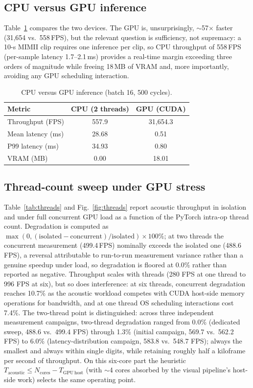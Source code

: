 \documentclass[review,nopreprintline]{elsarticle}
\begin{document}
\subsection{CPU versus GPU inference}
Table~\ref{tab:cpugpu} compares the two devices. The GPU is, unsurprisingly, $\sim$57$\times$ faster (31{,}654 vs.\ 558\,FPS), but the relevant question is sufficiency, not supremacy: a 10-s MIMII clip requires one inference per clip, so CPU throughput of 558\,FPS (per-sample latency 1.7--2.1\,ms) provides a real-time margin exceeding three orders of magnitude while freeing 18\,MB of VRAM and, more importantly, avoiding any GPU scheduling interaction.

\begin{table}[t]
\centering
\caption{CPU versus GPU inference (batch 16, 500 cycles).}
\label{tab:cpugpu}
\begin{tabular}{lcc}
\toprule
Metric & CPU (2 threads) & GPU (CUDA) \\
\midrule
Throughput (FPS) & 557.9 & 31{,}654.3 \\
Mean latency (ms) & 28.68 & 0.51 \\
P99 latency (ms) & 34.93 & 0.80 \\
VRAM (MB) & 0.00 & 18.01 \\
\bottomrule
\end{tabular}
\end{table}

\subsection{Thread-count sweep under GPU stress}
Table~\ref{tab:threads} and Fig.~\ref{fig:threads} report acoustic throughput in isolation and under full concurrent GPU load as a function of the PyTorch intra-op thread count. Degradation is computed as $\max(0, (\mathrm{isolated}-\mathrm{concurrent})/\mathrm{isolated}) \times 100\%$; at two threads the concurrent measurement (499.4\,FPS) nominally exceeds the isolated one (488.6\,FPS), a reversal attributable to run-to-run measurement variance rather than a genuine speedup under load, so degradation is floored at 0.0\% rather than reported as negative. Throughput scales with threads (280 FPS at one thread to 996 FPS at six), but so does interference: at six threads, concurrent degradation reaches 10.7\% as the acoustic workload competes with CUDA host-side memory operations for bandwidth, and at one thread OS scheduling interactions cost 7.4\%. The two-thread point is distinguished: across three independent measurement campaigns, two-thread degradation ranged from 0.0\% (dedicated sweep, 488.6 vs.\ 499.4 FPS) through 1.3\% (initial campaign, 569.7 vs.\ 562.2 FPS) to 6.0\% (latency-distribution campaign, 583.8 vs.\ 548.7 FPS); always the smallest and always within single digits, while retaining roughly half a kiloframe per second of throughput. On this six-core part the heuristic $T_\mathrm{acoustic} \le N_\mathrm{cores} - T_\mathrm{GPU\,host}$ (with $\sim$4 cores absorbed by the visual pipeline's host-side work) selects the same operating point.
\end{document}
